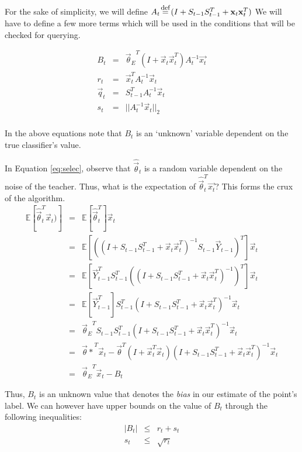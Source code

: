For the sake of simplicity, we will define $A_t \defeq (I + S_{t-1}S_{t-1}^T + \vec{x}_t \vec{x}_t ^T)$
We will have to define a few more terms which will be used in the conditions that will be checked for querying. 

\begin{equation}
\begin{array}{rcl}
B_t &=& {\vec{\theta}_E}^T (I + \vec{x}_t \vec{x}_t^T)A_t^{-1}\vec{x_t} \\
r_t &=& \vec{x}_t^T A_t^{-1} \vec{x}_t \\
\vec{q}_t &=& S_{t-1}^T A_{t}^{-1} \vec{x}_t \\
s_t &=& || A_t^{-1} \vec{x}_t||_2 \\ 
\end{array}
\end{equation}

In the above equations note that $B_t$ is an `unknown' variable dependent on the true classifier's value. 

In Equation \eqref{eq:selec}, observe that $\hat{\vec{\theta}}_t$ is a random variable dependent on the noise of the teacher. Thus, what is the expectation of $\hat{\vec{\theta}}_t ^T \vec{x_t}$? This forms the crux of the algorithm. 
\begin{equation}
\begin{array}{rcl}
\mathbb{E}[\hat{\vec{\theta}}_t^T\vec{x}_t)] &=& \mathbb{E}[\hat{\vec{\theta}}_t ^T]\vec{x}_t \\
&=& \mathbb{E}[((I + S_{t-1}S_{t-1}^T + \vec{x}_t \vec{x}_t ^T)^{-1} S_{t-1} \vec{Y}_{t-1})^T]\vec{x}_t \\
&=& \mathbb{E}[\vec{Y}_{t-1}^T S_{t-1}^T \left((I + S_{t-1}S_{t-1}^T + \vec{x}_t \vec{x}_t ^T)^{-1} \right)^T ]\vec{x}_t \\
&=& \mathbb{E}[\vec{Y}_{t-1}^T ] S_{t-1}^T (I + S_{t-1}S_{t-1}^T + \vec{x}_t \vec{x}_t ^T)^{-1} \vec{x}_t \\
&=& {\vec{\theta}_E}^T S_{t-1}S_{t-1}^T (I + S_{t-1}S_{t-1}^T + \vec{x}_t \vec{x}_t ^T)^{-1} \vec{x}_t \\
&=& {\vec{\theta}*}^T \vec{x}_t - \vec{\theta}^T(I + \vec{x}_t ^T \vec{x}_t)(I + S_{t-1}S_{t-1}^T + \vec{x}_t \vec{x}_t ^T)^{-1} \vec{x}_t\\
&=& {\vec{\theta}_E}^T \vec{x}_t - B_t
\end{array}
\end{equation} 

Thus, $B_t$ is an unknown value that denotes the \textit{bias} in our estimate of the point's label. We can however have upper bounds on the value of $B_t$ through the following inequalities:
\begin{equation}
\begin{array}{rcl}
|B_t| &\leq & r_t + s_t \\
s_t &\leq & \sqrt{r_t}
\end{array}
\end{equation} 

